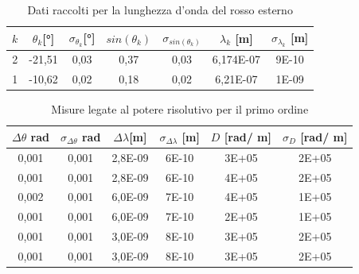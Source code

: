 \documentclass{article}
\begin{document}
        \begin{table}[H]

            \centering

            \begin{tabular}{c c c c c c c}

                \toprule 
                $k$ & $\theta_k$[°] & $\sigma_{\theta_k}$[°] & $sin(\theta_k)$ & $\sigma_{sin(\theta_k)}$ & $\lambda_k$ [m] & $\sigma_{\lambda_k}$ [m] \\
                
                \midrule
                2	&	-21,51	&	0,03	&	0,37	&	0,03	&	6,174E-07	&	9E-10\\
                1	&	-10,62	&	0,02	&	0,18	&	0,02	&	6,21E-07	&	1E-09\\
                \bottomrule

            \end{tabular}

            \caption{Dati raccolti per la lunghezza d'onda del rosso esterno}
            
        \end{table}
        \label{table:rosso est}

            
        \begin{table}[H]
            \centering
            \begin{tabular}{c c c c c c }
                \toprule 
                $\Delta \theta$ rad &$\sigma_{\Delta \theta}$ rad & $\Delta \lambda$[m]  & $\sigma_{\Delta \lambda}$ [m] & $D$ [rad/ m] & $\sigma_D$ [rad/ m] \\
                \midrule
                0,001	&	0,001	&	2,8E-09	&	6E-10	&	3E+05	&	2E+05\\
                0,001	&	0,001	&	2,8E-09	&	6E-10	&	4E+05	&	2E+05\\
                0,002	&	0,001	&	6,0E-09	&	7E-10	&	4E+05	&	1E+05\\
                0,001	&	0,001	&	6,0E-09	&	7E-10	&	2E+05	&	1E+05\\
                0,001	&	0,001	&	3,0E-09	&	8E-10	&	3E+05	&	2E+05\\
                0,001	&	0,001	&	3,0E-09	&	8E-10	&	3E+05	&	2E+05\\
                \bottomrule
            \end{tabular}
            \caption{Misure legate al potere risolutivo per il primo ordine}
            \label{D ordine 1}
        \end{table}
    
\end{document}
